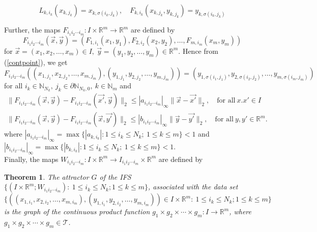 \documentclass[10pt,a4paper]{amsart}
\newtheorem{thm}{Theorem}
\newcommand{\myseries}[3]{#1\leq #2\leq #3}
\newcommand{\myvec}[3]{#1=(#2_1,#2_2,\ldots,#2_#3)}
\newcommand{\prodifs}[1]{#1_{i_1i_2\cdots i_m}}
\newcommand{\prodpoint}[2]{#1_{1,#2_1},#1_{2,#2_2},\ldots,#1_{m,#2_m}}
\newcommand{\profunc}[1]{#1_1\times#1_2\times\cdots\times#1_m}
\begin{document}
	\begin{equation}
		L_{k,i_k}(x_{k,j_k})=x_{k,\sigma(i_k,j_k)},\quad F_{k,i_k}(x_{k,j_k},y_{k,j_k})=y_{k,\sigma(i_k,j_k)}
		\label{contpoint}
	\end{equation}

	Further, the maps $\prodifs{F}:I\times\mathbb{R}^m\rightarrow\mathbb{R}^m$ are defined by 
	\begin{equation}
		\prodifs{F}(\vec{x},\vec{y})=(F_{1,i_1}(x_1,y_1),F_{2,i_2}(x_2,y_2),\ldots,F_{m,i_m}(x_m,y_m)) \label{prod of F}
	\end{equation}
	for $\myvec{\vec{x}}{x}{m}\in I,~\myvec{\vec{y}}{y}{m}\in\mathbb{R}^m.$ Hence from (\ref{contpoint}), we get 
	\begin{equation}
		\prodifs{F}((\prodpoint{x}{j}),(\prodpoint{y}{j}))=(y_{1,\sigma(i_1,j_1)},y_{2,\sigma(i_2,j_2)},\ldots,y_{m,\sigma(i_m,j_m)})
		\label{prodofF}
	\end{equation}
	for all $i_k\in \mathbb{N}_{N_k},~j_k\in \partial\mathbb{N}_{N_k,0},~ k\in\mathbb{N}_m$ and 
	\begin{equation}
		\left. \begin{array}{ll}
			\lVert \prodifs{F}(\vec{x},\vec{y})-\prodifs{F}(\vec{x'},\vec{y})\rVert_2\leq |\prodifs{a}|_{\infty}\lVert \vec{x}-\vec{x'}\rVert_2,\quad\mbox{for all}~ x.x'\in I\\
			\lVert \prodifs{F}(\vec{x},\vec{y})-\prodifs{F}(\vec{x},\vec{y'})\rVert_2\leq |\prodifs{b}|_{\infty}\lVert \vec{y}-\vec{y'}\rVert_2,\quad\mbox{for all}~ y,y'\in\mathbb{R}^m.
		\end{array} \right. 
		\label{cont.of F}
	\end{equation}
	where $|\prodifs{a}|_{\infty}=\max\{|a_{k,i_k}|:\myseries{1}{i_k}{N_k};~\myseries{1}{k}{m}\}<1$ and  $|\prodifs{b}|_{\infty}=\max\{|b_{k,i_k}|:\myseries{1}{i_k}{N_k};~\myseries{1}{k}{m}\}<1$.\\
	Finally, the maps $\prodifs{W}:I\times\mathbb{R}^m\rightarrow\prodifs{I}\times\mathbb{R}^m$ are defined by 

	\begin{thm}
		The attractor $G$ of the IFS $\{(I\times\mathbb{R}^m;\prodifs{W}):~\myseries{1}{i_k}{N_k};\myseries{1}{k}{m}\}$, associated with the data set $\{((\prodpoint{x}{i}),(\prodpoint{y}{i}))\in I\times\mathbb{R}^m:~\myseries{1}{i_k}{N_k};\myseries{1}{k}{m}\}$ is the graph of the continuous product function $\profunc{g}: I\rightarrow\mathbb{R}^m$, where $\profunc{g}\in\mathscr{T}$. \label{graphofcpf}
	\end{thm}
\end{document}
